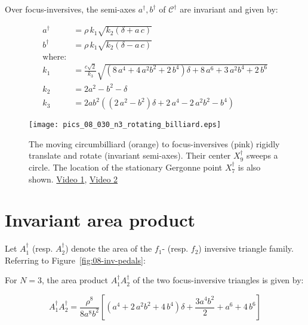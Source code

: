 \begin{proposition}
Over focus-inversives, the semi-axes $a^\dagger,b^\dagger$ of $\mathcal{C}^\dagger$ are invariant and given by:

\begin{align*}
    a^\dagger&= \rho\,k_1
\sqrt {k_2\left(\delta+a\,c\right)}\\
    b^\dagger&= \rho\,k_1
\sqrt {k_2\left(\delta-a\,c\right) }\\
 \mbox{where:}&\\
k_1&=\frac{c \sqrt{2}}{k_3}\sqrt { \left( 8\,{a}^{4}+4\,{a}^{2}{b}^{2}+2\,{b}^{4}
 \right) \delta+8\,{a}^{6}+3\,{a}^{2}{b}^{4}+2\,{b}^{6}}\\
 k_2&=2 a^2-b^2-\delta\\
k_3&=2a  {b}^{2} \left(  \left( 2\,{a}^{2}-{b}^{2} \right) \delta+2
\,{a}^{4}-2\,{a}^{2}{b}^{2}-{b}^{4}\right)
\end{align*}
\end{proposition}

\begin{figure}
    \centering
    \texttt{[image: pics\_08\_030\_n3\_rotating\_billiard.eps]}
    \caption{The moving circumbilliard (orange) to focus-inversives (pink) rigidly translate and rotate (invariant semi-axes). Their center $X_9^\dagger$ sweeps a circle. The location of the stationary Gergonne point $X_7^\dagger$ is also shown. \href{https://youtu.be/LOJK5izTctI}{Video 1}, \href{https://youtu.be/Y-j5eXqKGQE}{Video 2}}
    \label{fig:08-n3-moving-billiard-table}
\end{figure}

\section{Invariant area product}

Let $A_1^\dagger$ (resp. $A_2^\dagger$) denote the area of the $f_1$- (resp. $f_2$) inversive triangle family. Referring to Figure~\ref{fig:08-inv-pedals}:

\begin{proposition}
For $N=3$, the area product $A_1^\dagger A_2^\dagger$ of the two focus-inversive triangles is given by:

\[ A_1^\dagger A_2^\dagger= \frac{\rho^8}{8 a^8 b^2}  \left[\left( {a}^{4}+2\,{a}^{2}{b}^{2}+4\,{b}^{4} \right)\delta +  \frac{3 a^{4} b^{2}}{2}+a^6+4\,{b}^{6} \right]
\]
\end{proposition}

